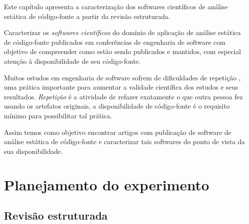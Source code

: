 {Este capítulo apresenta a caracterização dos softwares científicos de análise
estática de código-fonte a partir da revisão estruturada.}
\label{caracterizacao-ferramentas}

Caracterizar os {\it softwares científicos} do domínio de aplicação de análise
estática de código-fonte publicados em conferências de engenharia de software
com objetivo de compreender como estão sendo publicados e mantidos, com
especial atenção à disponibilidade de seu código-fonte.

Muitos estudos em engenharia de software sofrem de dificuldades de repetição
\cite{Tang2016}, uma prática importante para aumentar a validade científica dos
estudos e seus resultados. {\it Repetição} é a atividade de refazer exatamente
o que outra pessoa fez usando os artefatos originais, a disponibilidade de
código-fonte é o requisito mínimo para possibilitar tal prática.

Assim temos como objetivo encontrar artigos com publicação de software de
análise estática de código-fonte e caracterizar tais softwares do ponto de
vista da sua disponibilidade.

\section{Planejamento do experimento}

%
%

\subsection{Revisão estruturada}

